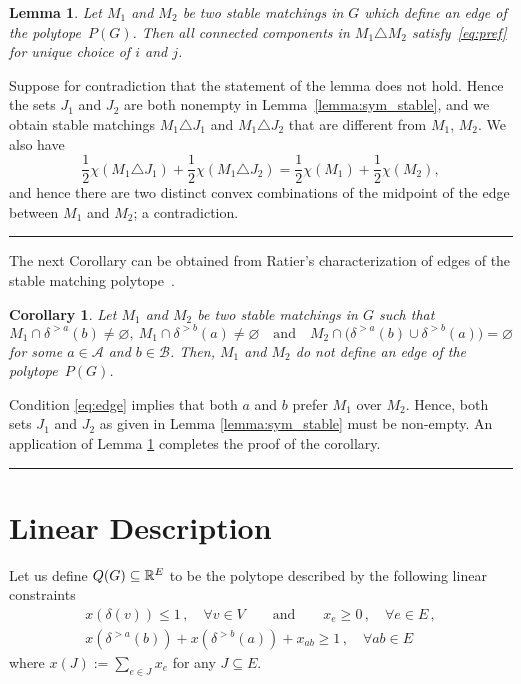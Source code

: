 \documentclass[3p,times]{elsarticle}
\newtheorem{lemma}[fact]{Lemma}
\newtheorem{corollary}[fact]{Corollary}
\newenvironment{proof}{{\bf Proof:  }}{\hfill\rule{2mm}{2mm}}
\begin{document}
\begin{lemma}\label{lemma:edge}
  Let $M_1$ and $M_2$ be two stable matchings in $G$ which define an
  edge of the polytope~$P(G)$. 
  Then all connected components in
  $M_1\triangle M_2$ satisfy~\eqref{eq:pref} for unique choice of $i$
  and $j$. 
\end{lemma}
\begin{proof}
  Suppose for contradiction that the statement of the lemma does not
  hold. Hence the sets $J_1$ and $J_2$ are both nonempty in
  Lemma~\ref{lemma:sym_stable}, and we obtain stable matchings
  $M_1\triangle J_1$ and $M_1\triangle J_2$ that are different from $M_1$,
  $M_2$. 
  We also have 
  \[ \frac{1}{2}\chi(M_1\triangle J_1)+\frac{1}{2}\chi(M_1\triangle
  J_2) =\frac{1}{2}\chi(M_1)+\frac{1}{2}\chi(M_2),\]
  and hence there are two distinct convex combinations of the midpoint
  of the edge between $M_1$ and $M_2$; a contradiction. 
\end{proof}

The next Corollary can be obtained from Ratier's characterization of edges of the stable matching polytope~\cite{ratier1996stable}.

\begin{corollary}\label{cor:edge}
Let $M_1$ and $M_2$ be two stable matchings in $G$ such that
\begin{equation}\label{eq:edge}
M_1\cap\delta^{>a}(b)\neq\varnothing,\
M_1\cap\delta^{>b}(a)\neq\varnothing\quad\text{and}\quad
M_2\cap\big(\delta^{>a}(b)\cup \delta^{>b}(a)\big)=\varnothing
\end{equation}
 for some $a\in\mathcal{A}$ and $b\in\mathcal{B}$. Then, $M_1$ and $M_2$ do not define an edge of the polytope~$P(G)$.
\end{corollary}
\begin{proof}
  Condition \eqref{eq:edge} implies that both $a$ and $b$ prefer
  $M_1$ over $M_2$. Hence, both sets $J_1$ and $J_2$ as given in Lemma
  \ref{lemma:sym_stable} must be non-empty. An application of Lemma
  \ref{lemma:edge} completes the proof of the corollary.
\end{proof}



\section{Linear Description}\label{section:theorem}
Let us define $Q(G)\subseteq\mathbb{R}^E$ to be the polytope described by the
following linear constraints
\begin{align}
  x(\delta(v)) \leq 1\,,\quad \forall v \in V\qquad \text{and} \qquad x_e \geq 0\,,\quad \forall e \in E\,,\label{eq:lin_descr_match}\\
  x(\delta^{>a}(b))+ x(\delta^{>b}(a)) + x_{ab} \geq 1\,, \quad \forall ab \in E \label{eq:lin_descr_stab}
\end{align}
where $x(J) := \sum_{e \in J} x_e$ for any $J \subseteq E$.
\end{document}
